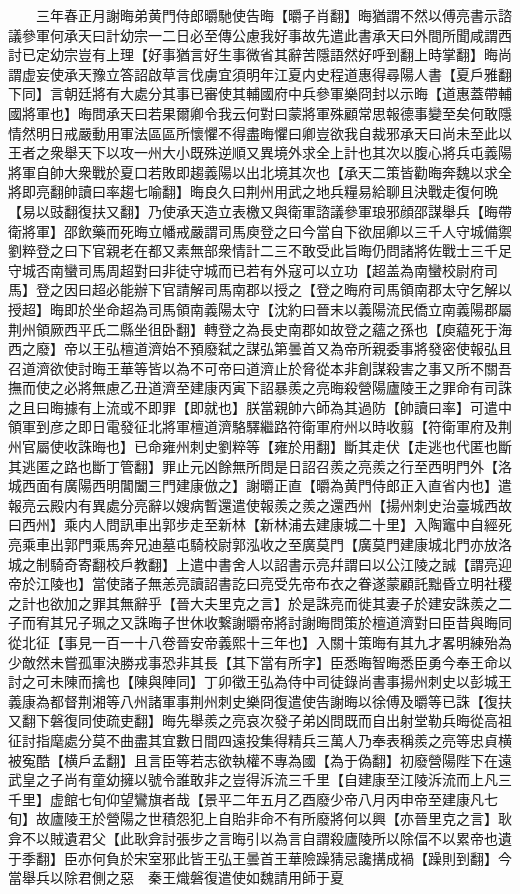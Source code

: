 　　三年春正月謝晦弟黄門侍郎㬭馳使告晦【㬭子肖翻】晦猶謂不然以傅亮書示諮議參軍何承天曰計幼宗一二日必至傳公慮我好事故先遣此書承天曰外間所聞咸謂西討已定幼宗豈有上理【好事猶言好生事微省其辭苦隱語然好呼到翻上時掌翻】晦尚謂虚妄使承天豫立答詔啟草言伐虜宜須明年江夏内史程道惠得尋陽人書【夏戶雅翻下同】言朝廷將有大處分其事已審使其輔國府中兵參軍樂冏封以示晦【道惠蓋帶輔國將軍也】晦問承天曰若果爾卿令我云何對曰蒙將軍殊顧常思報德事變至矣何敢隱情然明日戒嚴動用軍法區區所懷懼不得盡晦懼曰卿豈欲我自裁邪承天曰尚未至此以王者之衆舉天下以攻一州大小既殊逆順又異境外求全上計也其次以腹心將兵屯義陽將軍自帥大衆戰於夏口若敗即趨義陽以出北境其次也【承天二策皆勸晦奔魏以求全將即亮翻帥讀曰率趨七喻翻】晦良久曰荆州用武之地兵糧易給聊且決戰走復何晩【易以豉翻復扶又翻】乃使承天造立表檄又與衛軍諮議參軍琅邪顔邵謀舉兵【晦帶衛將軍】邵飲藥而死晦立幡戒嚴謂司馬庾登之曰今當自下欲屈卿以三千人守城備禦劉粹登之曰下官親老在都又素無部衆情計二三不敢受此旨晦仍問諸將佐戰士三千足守城否南蠻司馬周超對曰非徒守城而已若有外寇可以立功【超盖為南蠻校尉府司馬】登之因曰超必能辦下官請解司馬南郡以授之【登之晦府司馬領南郡太守乞解以授超】晦即於坐命超為司馬領南義陽太守【沈約曰晉末以義陽流民僑立南義陽郡屬荆州領厥西平氏二縣坐徂卧翻】轉登之為長史南郡如故登之蘊之孫也【庾藴死于海西之廢】帝以王弘檀道濟始不預廢弑之謀弘第曇首又為帝所親委事將發密使報弘且召道濟欲使討晦王華等皆以為不可帝曰道濟止於脅從本非創謀殺害之事又所不關吾撫而使之必將無慮乙丑道濟至建康丙寅下詔暴羨之亮晦殺營陽廬陵王之罪命有司誅之且曰晦據有上流或不即罪【即就也】朕當親帥六師為其過防【帥讀曰率】可遣中領軍到彦之即日電發征北將軍檀道濟駱驛繼路符衛軍府州以時收翦【符衛軍府及荆州官屬使收誅晦也】已命雍州刺史劉粹等【雍於用翻】斷其走伏【走逃也代匿也斷其逃匿之路也斷丁管翻】罪止元凶餘無所問是日詔召羨之亮羨之行至西明門外【洛城西面有廣陽西明閶闔三門建康倣之】謝㬭正直【㬭為黄門侍郎正入直省内也】遣報亮云殿内有異處分亮辭以嫂病暫還遣使報羨之羨之還西州【揚州刺史治臺城西故曰西州】乘内人問訊車出郭步走至新林【新林浦去建康城二十里】入陶竈中自經死亮乘車出郭門乘馬奔兄迪墓屯騎校尉郭泓收之至廣莫門【廣莫門建康城北門亦放洛城之制騎奇寄翻校戶教翻】上遣中書舍人以詔書示亮幷謂曰以公江陵之誠【謂亮迎帝於江陵也】當使諸子無恙亮讀詔書訖曰亮受先帝布衣之眷遂蒙顧託黜昏立明社稷之計也欲加之罪其無辭乎【晉大夫里克之言】於是誅亮而徙其妻子於建安誅羨之二子而宥其兄子珮之又誅晦子世休收繋謝㬭帝將討謝晦問策於檀道濟對曰臣昔與晦同從北征【事見一百一十八卷晉安帝義熙十三年也】入關十策晦有其九才畧明練殆為少敵然未嘗孤軍決勝戎事恐非其長【其下當有所字】臣悉晦智晦悉臣勇今奉王命以討之可未陳而擒也【陳與陣同】丁卯徵王弘為侍中司徒錄尚書事揚州刺史以彭城王義康為都督荆湘等八州諸軍事荆州刺史樂冏復遣使告謝晦以徐傅及㬭等已誅【復扶又翻下磐復同使疏吏翻】晦先舉羨之亮哀次發子弟凶問既而自出射堂勒兵晦從高祖征討指麾處分莫不曲盡其宜數日間四遠投集得精兵三萬人乃奉表稱羨之亮等忠貞横被寃酷【横戶孟翻】且言臣等若志欲執權不專為國【為于偽翻】初廢營陽陛下在遠武皇之子尚有童幼擁以號令誰敢非之豈得泝流三千里【自建康至江陵泝流而上凡三千里】虚館七旬仰望鸞旗者哉【景平二年五月乙酉廢少帝八月丙申帝至建康凡七旬】故廬陵王於營陽之世積怨犯上自貽非命不有所廢將何以興【亦晉里克之言】耿弇不以賊遺君父【此耿弇討張步之言晦引以為言自謂殺廬陵所以除偪不以累帝也遺于季翻】臣亦何負於宋室邪此皆王弘王曇首王華險躁猜忌讒搆成禍【躁則到翻】今當舉兵以除君側之惡　秦王熾磐復遣使如魏請用師于夏